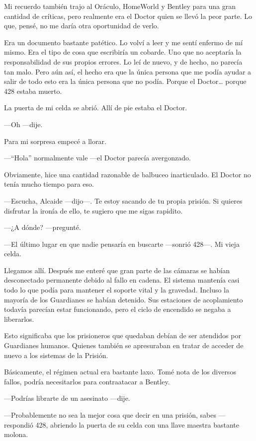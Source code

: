 Mi recuerdo también trajo al Oráculo, HomeWorld y Bentley para una gran
cantidad de críticas, pero realmente era el Doctor quien se llevó la
peor parte. Lo que, pensé, no me daría otra oportunidad de verlo.

Era un documento bastante patético. Lo volví a leer y me sentí enfermo
de mí mismo. Era el tipo de cosa que escribiría un cobarde. Uno que no
aceptaría la responsabilidad de sus propios errores. Lo leí de nuevo, y
de hecho, no parecía tan malo. Pero aún así, el hecho era que la única
persona que me podía ayudar a salir de todo esto era la única persona
que no podía. Porque el Doctor\ldots{} porque 428 estaba muerto.

La puerta de mi celda se abrió. Allí de pie estaba el Doctor.

---Oh ---dije.

Para mi sorpresa empecé a llorar.

---``Hola'' normalmente vale ---el Doctor parecía avergonzado.

Obviamente, hice una cantidad razonable de balbuceo inarticulado. El
Doctor no tenía mucho tiempo para eso.

---Escucha, Alcaide ---dijo---. Te estoy sacando de tu propia prisión.
Si quieres disfrutar la ironía de ello, te sugiero que me sigas
rapidito.

---¿A dónde? ---pregunté.

---El último lugar en que nadie pensaría en buscarte ---sonrió 428---.
Mi vieja celda.

Llegamos allí. Después me enteré que gran parte de las cámaras se habían
desconectado permanente debido al fallo en cadena. El sistema mantenía
casi todo lo que podía para mantener el soporte vital y la gravedad.
Incluso la mayoría de los Guardianes se habían detenido. Sus estaciones
de acoplamiento todavía parecían estar funcionando, pero el ciclo de
encendido se negaba a liberarlos.

Esto significaba que los prisioneros que quedaban debían de ser
atendidos por Guardianes humanos. Quienes también se apresuraban en
tratar de acceder de nuevo a los sistemas de la Prisión.

Básicamente, el régimen actual era bastante laxo. Tomé nota de los
diversos fallos, podría necesitarlos para contraatacar a Bentley.

---Podrías librarte de un asesinato ---dije.

---Probablemente no sea la mejor cosa que decir en una prisión, sabes
---respondió 428, abriendo la puerta de su celda con una llave maestra
bastante molona.

